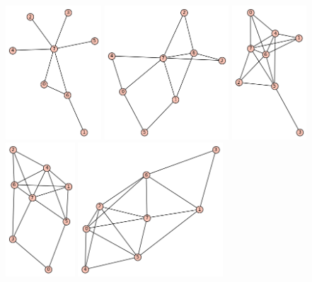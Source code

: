\documentclass[10pt, a4paper]{article}
\begin{document}
\begin{center}
\includegraphics[height=5cm]{min_graf_8_1}
\includegraphics[height=5cm]{min_graf_8_2}
\includegraphics[height=5cm]{min_graf_8_3}
\includegraphics[height=5cm]{min_graf_8_4}
\includegraphics[height=5cm]{min_graf_8_5}
\end{center}
\end{document}
